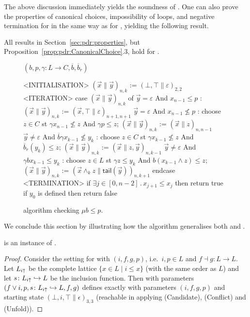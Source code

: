 The above discussion immediately yields the soundness of \APDRAI. One can also prove the properties of canonical choices, impossibility of loops, and negative termination for \APDRAI{} in the same way as for \ADPDR{}, yielding the following result.
\begin{theorem}
	All results in Section~\ref{sec:pdr:properties}, but Proposition~\ref{prop:pdr:CanonicalChoice}.3, hold for \APDRAI{}.
\end{theorem}

\begin{figure}[t]
	\centering
	\underline{{\APDRAI} $(b,p, \gamma\colon L \to C, \overline{b}, \overline{b}_r)$}
	\begin{codeNT}
<INITIALISATION>
  $( \vec{x} \| \vec{y} )_{n,k}$ := $(\bot,\top\|\varepsilon)_{2,2}$
<ITERATION>			                %
  case $( \vec{x} \| \vec{y} )_{n,k}$ of
	  $\vec{y}=\varepsilon$ And $x_{n-1} \le p$     :                    %
		$( \vec{x} \| \vec{y} )_{n,k}$ := $( \vec{x}, \top \| \varepsilon )_{n+1,n+1}$
	  $\vec{y}=\varepsilon$ And $x_{n-1} \not \le p$    :                     %
		choose $z\in C$ st $\gamma x_{n-1} \not \le z$ And  $\gamma p \le z$;
		$( \vec{x} \| \vec{y} )_{n,k}$ := $( \vec{x} \| z )_{n,n-1}$
	  $\vec{y} \neq \varepsilon$ And $\overline{b}\gamma x_{k-1} \not \le y_k$ :                        %
		choose $z \in C$ st $\gamma x_{k-1} \not \le z$ And $\overline{b}_r(y_k) \le z$;
		$(\vec{x} \| \vec{y} )_{n,k}$ := $(\vec{x} \| z , \vec{y} )_{n,k-1}$
	  $\vec{y} \neq \varepsilon$ And $\gamma b x_{k-1} \le y_k$ :                        %
		choose $z \in L$ st $\gamma z \le y_k$ And $b(x_{k-1} \land z) \le z$;
		$(\vec{x} \| \vec{y} )_{n,k}$ := $(\vec{x} \land_k z \| \mathsf{tail}(\vec{y}) )_{n,k+1}$
  endcase
<TERMINATION>
  if $\exists j\in [0,n-2]\,.\, x_{j+1} \le x_j$ then return true		 %
  if $y_0$ is defined then return false	  	%
\end{codeNT}
	\caption{{\APDRAI} algorithm checking $\mu b \le p$.}\label{fig:pdr:adjai}
\end{figure}

We conclude this section by illustrating how the algorithm \APDRAI{} generalises both \APDR{} and \ADPDR{}.
\begin{prop}\label{prop:pdr:instanceAI}
	\APDR{} is an instance of \APDRAI{}.
\end{prop}
\begin{proof}
	Consider the setting for \APDR with $(i, f, g, p)$, i.e.~$i, p \in L$ and $f \dashv g \colon L \to L$. Let $L_{i \uparrow}$ be the complete lattice $\{ x \in L \mid i \le x \}$ (with the same order as $L$) and let $s \colon L_{i \uparrow} \hookrightarrow L$ be the inclusion function. Then \APDRAI with parameters $(f \lor i, p, s\colon L_{i \uparrow} \hookrightarrow L, f, g)$ defines exactly \APDR{} with parameters $(i, f, g, p)$ and starting state $(\bot, i, \top \| \epsilon)_{3, 3}$ (reachable in \APDR{} applying (Candidate), (Conflict) and (Unfold)).
\end{proof}

